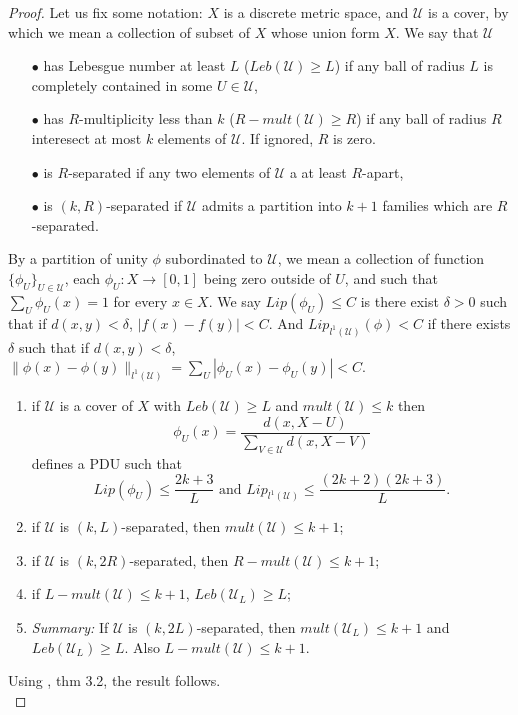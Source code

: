 \begin{proof}
Let us fix some notation: $X$ is a discrete metric space, and $\mathcal U$ is a cover, by which we mean a collection of subset of $X$ whose union form $X$. We say that $\mathcal U$
\begin{itemize}
\item[$\bullet$] has Lebesgue number at least $L$ ($Leb(\mathcal U) \geq L$) if any ball of radius $L$ is completely contained in some $U\in \mathcal U$, 
\item[$\bullet$] has $R$-multiplicity less than $k$ ($R-mult(\mathcal U) \geq R$) if any ball of radius $R$ interesect at most $k$ elements of $\mathcal U$. If ignored, $R$ is zero. 
\item[$\bullet$] is $R$-separated if any two elements of $\mathcal U$ a at least $R$-apart,
\item[$\bullet$] is $(k,R)$-separated if $\mathcal U$ admits a partition into $k+1$ families which are $R$-separated.
\end{itemize}

By a partition of unity $\phi$ subordinated to $\mathcal U$, we mean a collection of function $\{\phi_U\}_{U\in \mathcal U}$, each $\phi_U : X \rightarrow [0,1]$ being zero outside of $U$, and such that $\sum_U \phi_U(x) = 1$ for every $x\in X$. We say $Lip(\phi_U)\leq C$ is there exist $\delta >0$ such that if $d(x,y)<\delta$, $|f(x)-f(y)|< C$. And $Lip_{l^1(\mathcal U)}(\phi)< C$ if there exists $\delta$ such that if $d(x,y)< \delta$, $\| \phi(x)- \phi(y) \|_{l^1(\mathcal U)} =\sum_U |\phi_U(x)-\phi_U(y)| < C$.
\begin{enumerate}
\item if $\mathcal U$ is a cover of $X$ with $Leb(\mathcal U) \geq L$ and $mult(\mathcal U)\leq k$ then
\[\phi_U (x) = \frac{d(x,X -U)}{\sum_{V\in \mathcal U} d(x,X -V)}\]
defines a PDU such that 
\[Lip(\phi_U)\leq \frac{2k+3}{L} \text{ and }Lip_{l^1(\mathcal U)} \leq \frac{(2k+2)(2k+3)}{L}.\]
\item if $\mathcal U$ is $(k,L)$-separated, then $mult(\mathcal U) \leq k+1$; 
\item if $\mathcal U$ is $(k,2R)$-separated, then $R-mult(\mathcal U) \leq k+1$;
\item if $L-mult(\mathcal U)\leq k+1$, $Leb(\mathcal U_L)\geq L$;
\item \textit{Summary:} If $\mathcal U$ is $(k,2L)$-separated, then $mult(\mathcal U_L)\leq k+1$ and $Leb(\mathcal U_L)\geq L $. Also $L-mult(\mathcal U )\leq k+1$. 
\end{enumerate}

Using \cite{dadarlat2007uniform}, thm 3.2, the result follows.\\
\end{proof}
 

